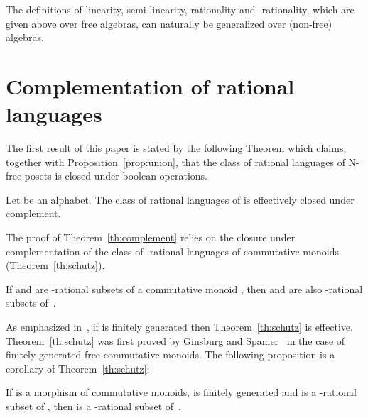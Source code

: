 \documentclass{CSML}
\begin{document}
The definitions of linearity, semi-linearity, rationality and -rationality, which are given above over free algebras, can naturally be generalized over (non-free) algebras.
 
\section{Complementation of rational languages}
\label{sec:complementation}

The first result of this paper is stated by the following Theorem which claims, together with Proposition~\ref{prop:union}, that the class of rational languages of N-free posets is closed under boolean operations.
\begin{thm}
  \label{th:complement}
  Let  be an alphabet.
  The class of rational languages of  is effectively closed under complement.
\end{thm}

The proof of Theorem~\ref{th:complement} relies on the closure under complementation of the class of -rational languages of commutative monoids (Theorem~\ref{th:schutz}).
\begin{thm}
  \label{th:schutz}
  If  and  are -rational subsets of a commutative monoid , then  and  are also -rational subsets of~.
\end{thm}
As emphasized in~\cite{Saka:thAutoFr}, if  is finitely generated then Theorem~\ref{th:schutz} is effective.
Theorem~\ref{th:schutz} was first proved by Ginsburg and Spanier~\cite{GS:AMS64} in the case of finitely generated free commutative monoids. The following proposition is a corollary of Theorem~\ref{th:schutz}:
\begin{prop}
  \label{prop:morphInv}
  If  is a morphism of commutative monoids,  is finitely generated and  is a -rational subset of , then  is a -rational subset of~.
\end{prop}

\medskip
\end{document}
